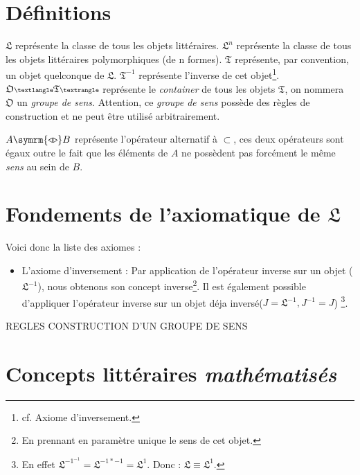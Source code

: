 \documentclass[12pt]{article} %
\begin{document}
\newpage
\section{Définitions}
$\mathfrak{L}$ représente la classe de tous les objets littéraires. \newline
$\mathfrak{L}^n$ représente la classe de tous les objets littéraires polymorphiques (de n formes). \newline
$\mathfrak{T}$ représente, par convention, un objet quelconque de $\mathfrak{L}$. \newline
$\mathfrak{T}^{-1}$ représente l'inverse de cet objet\footnote{cf. Axiome d'inversement.}. \newline
$\mathfrak{O} \scaleobj{0.7}{\textlangle} \mathfrak{T} \scaleobj{0.7}{\textrangle} $ représente le \textit{container} de tous les objets $\mathfrak{T}$, on nommera $\mathfrak{O}$ un \textit{groupe de sens}. Attention, ce \textit{groupe de sens} possède des règles de construction et ne peut être utilisé arbitrairement.\newline

$A \symrm{\triangleleft\triangleright} B$ représente l'opérateur alternatif à $\subset$, ces deux opérateurs sont égaux outre le fait que les éléments de $A$ ne possèdent pas forcément le même \textit{sens} au sein de $B$. \newline
\newpage

\section{Fondements de l'axiomatique de $\mathfrak{L}$}

Voici donc la liste des axiomes : 
\begin{itemize}
\item L'axiome d'inversement : \newline
Par application de l'opérateur inverse sur un objet ($\mathfrak{L}^{-1}$), nous obtenons son concept inverse\footnote{En prennant en paramètre unique le sens de cet objet.}. Il est également possible d'appliquer l'opérateur inverse sur un objet déja inversé($J = \mathfrak{L}^{-1}, J^{-1} = J$) \footnote{En effet $\mathfrak{L}^{-1^{-1}} = \mathfrak{L}^{-1*-1} = \mathfrak{L}^1$. Donc : $\mathfrak{L} \equiv \mathfrak{L}^1 $.}.
\end{itemize}


REGLES CONSTRUCTION D'UN GROUPE DE SENS

\newpage
\section{Concepts littéraires \textit{mathématisés}}
\end{document}
